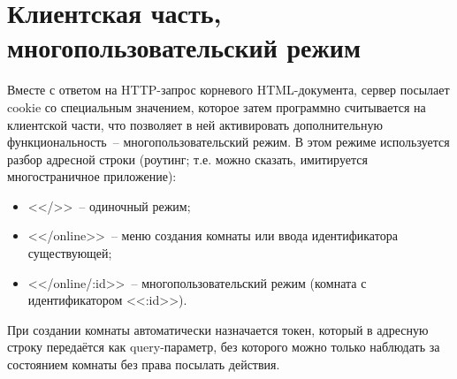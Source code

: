\section{Клиентская часть, многопользовательский режим}\label{clientonlineimpl}

\TODO

Вместе с ответом на HTTP-запрос корневого HTML-документа, сервер посылает cookie со специальным значением,
которое затем программно считывается на клиентской части, что позволяет в ней активировать дополнительную функциональность~--
многопользовательский режим. В этом режиме используется разбор адресной строки (роутинг; т.е. можно сказать,
имитируется многостраничное приложение):

\begin{itemize}
    \item <</>>~-- одиночный режим;
    \item <</online>>~-- меню создания комнаты или ввода идентификатора существующей;
    \item <</online/:id>>~-- многопользовательский режим (комната с идентификатором <<:id>>).
\end{itemize}

При создании комнаты автоматически назначается токен, который в адресную строку передаётся как query-параметр,
без которого можно только наблюдать за состоянием комнаты без права посылать действия.

\TODO
